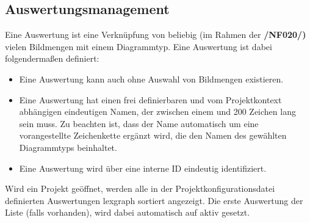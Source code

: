 \subsection{Auswertungsmanagement}

\label{subsec:auswertungsmgmt}

	Eine Auswertung ist eine Verknüpfung von beliebig (im Rahmen der \textbf{/NF020/)} vielen Bildmengen mit einem Diagrammtyp. Eine Auswertung ist dabei folgendermaßen definiert:

	\begin{itemize}

		\item Eine Auswertung kann auch ohne Auswahl von Bildmengen existieren. 

		\item Eine Auswertung hat einen frei definierbaren und vom Projektkontext abhängigen eindeutigen Namen, der zwischen einem und 200 Zeichen lang sein muss. Zu beachten ist, dass der Name automatisch um eine vorangestellte Zeichenkette ergänzt wird, die den Namen des gewählten Diagrammtyps beinhaltet.

		\item Eine Auswertung wird über eine interne ID eindeutig identifiziert.

	\end{itemize}

	Wird ein Projekt geöffnet, werden alle in der Projektkonfigurationsdatei definierten Auswertungen \gls{lexgraph} sortiert angezeigt. Die erste Auswertung der Liste (falls vorhanden), wird dabei automatisch auf aktiv gesetzt.

